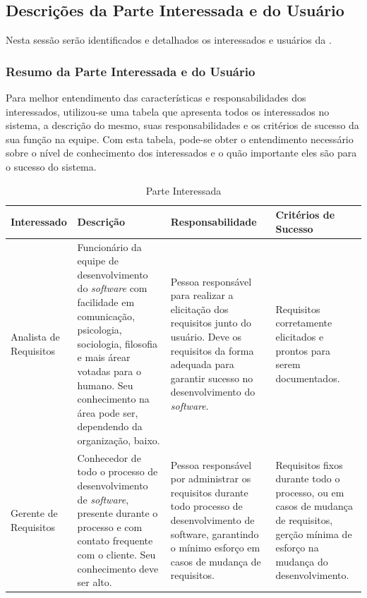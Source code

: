 \subsection{Descrições da Parte Interessada e do Usuário}

Nesta sessão serão identificados e detalhados os interessados e usuários da \nomeferramenta{}.

\subsubsection{Resumo da Parte Interessada e do Usuário}

Para melhor entendimento das características e responsabilidades dos interessados, utilizou-se uma tabela que apresenta todos os interessados no sistema, a descrição do mesmo, suas responsabilidades e os critérios de sucesso da sua função na equipe. Com esta tabela, pode-se obter o entendimento necessário sobre o nível de conhecimento dos interessados e o quão importante eles são para o sucesso do sistema.

\begin{table}[htbp]
\centering
\begin{tabular}{|p{2cm}|p{5cm}|p{4cm}|p{4cm}|}
\hline
\textbf{Interessado} & \textbf{Descrição} & \textbf{Responsabilidade} & \textbf{Critérios de Sucesso}  \\ \hline

Analista de Requisitos & Funcionário da equipe de desenvolvimento do \textit{software} com facilidade em comunicação, psicologia, sociologia, filosofia e mais árear votadas para o humano. Seu conhecimento na área pode ser, dependendo da organização, baixo. & Pessoa responsável para realizar a elicitação dos requisitos junto do usuário. Deve os requisitos da forma adequada para garantir sucesso no desenvolvimento do \textit{software}. & Requisitos corretamente elicitados e prontos para serem documentados. \\ \hline

Gerente de Requisitos & Conhecedor de todo o processo de desenvolvimento de \textit{software}, presente durante o processo e com contato frequente com o cliente. Seu conhecimento deve ser alto. & Pessoa responsável por administrar os requisitos durante todo processo de desenvolvimento de software, garantindo o mínimo esforço em casos de mudança de requisitos. & Requisitos fixos durante todo o processo, ou em casos de mudança de requisitos, gerção mínima de esforço na mudança do desenvolvimento. \\ \hline

\end{tabular}
\label{}
\caption{Parte Interessada}
\end{table}

